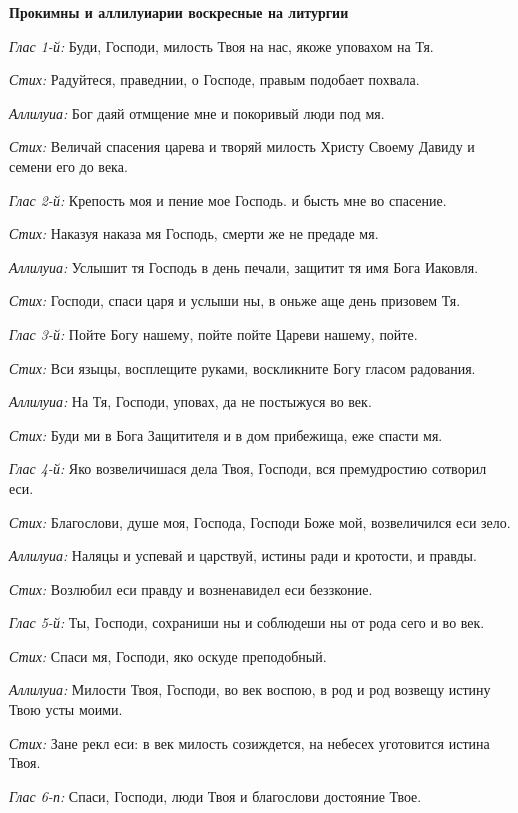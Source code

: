 {\bfseries Прокимны и аллилуиарии воскресные на литургии}

{\itshape Глас 1-й:} Буди, Господи, милость Твоя на нас, якоже уповахом на Тя.

{\itshape Стих:} Радуйтеся, праведнии, о Господе, правым подобает похвала.

{\itshape Аллилуиа:} Бог даяй отмщение мне и покоривый люди под мя.

{\itshape Стих:} Величай спасения царева и творяй милость Христу Своему Давиду и семени его до века.

{\itshape Глас 2-й:} Крепость моя и пение мое Господь. и бысть мне во спасение.

{\itshape Стих:} Наказуя наказа мя Господь, смерти же не предаде мя.

{\itshape Аллилуиа:} Услышит тя Господь в день печали, защитит тя имя Бога Иаковля.

{\itshape Стих:} Господи, спаси царя и услыши ны, в оньже аще день призовем Тя.

{\itshape Глас 3-й:} Пойте Богу нашему, пойте пойте Цареви нашему, пойте.

{\itshape Стих:} Вси языцы, восплещите руками, воскликните Богу гласом радования.

{\itshape Аллилуиа:} На Тя, Господи, уповах, да не постыжуся во век.

{\itshape Стих:} Буди ми в Бога Защитителя и в дом прибежища, еже спасти мя.

{\itshape Глас 4-й:} Яко возвеличишася дела Твоя, Господи, вся премудростию сотворил еси.

{\itshape Стих:} Благослови, душе моя, Господа, Господи Боже мой, возвеличился еси зело.

{\itshape Аллилуиа:} Наляцы и успевай и царствуй, истины ради и кротости, и правды.

{\itshape Стих:} Возлюбил еси правду и возненавидел еси беззконие.

{\itshape Глас 5-й:} Ты, Господи, сохраниши ны и соблюдеши ны от рода сего и во век.

{\itshape Стих:} Спаси мя, Господи, яко оскуде преподобный.

{\itshape Аллилуиа:} Милости Твоя, Господи, во век воспою, в род и род возвещу истину Твою усты моими.

{\itshape Стих:} Зане рекл еси: в век милость созиждется, на небесех уготовится истина Твоя.

{\itshape Глас 6-п:} Спаси, Господи, люди Твоя и благослови достояние Твое.

